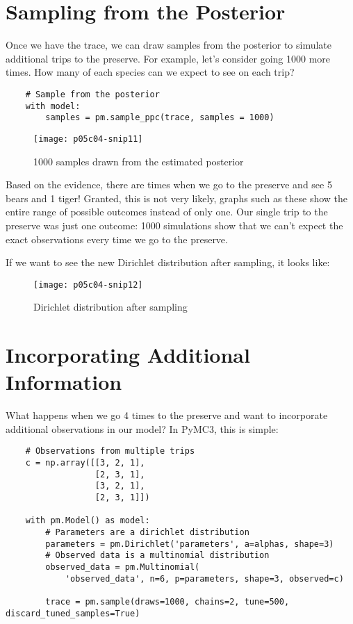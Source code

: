 \section{Sampling from the Posterior}

Once we have the trace, we can draw samples from the posterior to simulate additional trips to the preserve. For example, let's consider going 1000 more times. How many of each species can we expect to see on each trip?



\begin{lstlisting}
    # Sample from the posterior
    with model:
        samples = pm.sample_ppc(trace, samples = 1000)
\end{lstlisting}

\begin{figure*}[h]
    \texttt{[image: p05c04-snip11]}
    \caption{1000 samples drawn from the estimated posterior}
\end{figure*}

Based on the evidence, there are times when we go to the preserve and see 5 bears and 1 tiger! Granted, this is not very likely, graphs such as these show the entire range of possible outcomes instead of only one. Our single trip to the preserve was just one outcome: 1000 simulations show that we can't expect the exact observations every time we go to the preserve.

If we want to see the new Dirichlet distribution after sampling, it looks like:

\begin{figure*}[h]
    \texttt{[image: p05c04-snip12]}
    \caption{Dirichlet distribution after sampling}
\end{figure*}


\section{Incorporating Additional Information}

What happens when we go 4 times to the preserve and want to incorporate additional observations in our model? In PyMC3, this is simple:

\begin{lstlisting}
    # Observations from multiple trips
    c = np.array([[3, 2, 1],
                  [2, 3, 1],
                  [3, 2, 1],
                  [2, 3, 1]])
    
    with pm.Model() as model:
        # Parameters are a dirichlet distribution
        parameters = pm.Dirichlet('parameters', a=alphas, shape=3)
        # Observed data is a multinomial distribution
        observed_data = pm.Multinomial(
            'observed_data', n=6, p=parameters, shape=3, observed=c)    
        
        trace = pm.sample(draws=1000, chains=2, tune=500, discard_tuned_samples=True)
\end{lstlisting}

